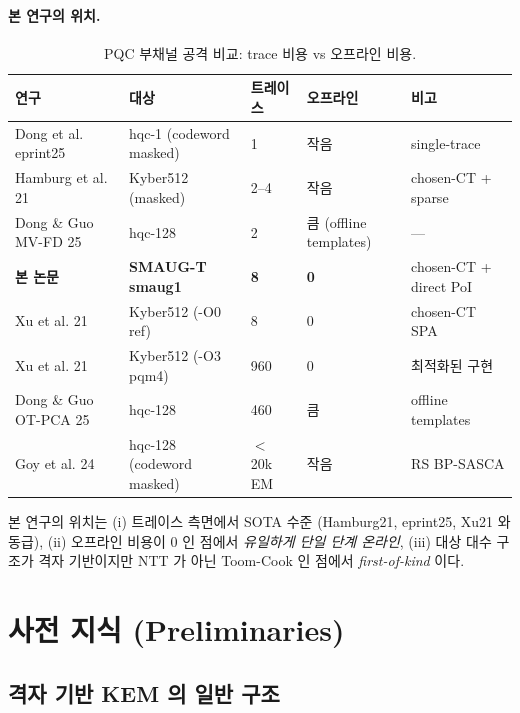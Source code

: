\documentclass[11pt]{article}
\theoremstyle{plain}
\theoremstyle{definition}
\theoremstyle{remark}
\begin{document}
\paragraph{본 연구의 위치.}

\begin{table}[h!]
\centering
\caption{PQC 부채널 공격 비교: trace 비용 vs 오프라인 비용.}
\label{tab:related}
\small
\begin{tabular}{lllll}
\toprule
연구 & 대상 & 트레이스 & 오프라인 & 비고 \\
\midrule
Dong et al. eprint25~\citep{donggu025singletrace} & hqc-1 (codeword masked) & 1 & 작음 & single-trace \\
Hamburg et al. 21~\citep{hamburg21} & Kyber512 (masked) & 2--4 & 작음 & chosen-CT + sparse \\
Dong \& Guo MV-FD 25~\citep{donggu025mvfd} & hqc-128 & 2 & 큼 (offline templates) & — \\
\textbf{본 논문} & \textbf{SMAUG-T smaug1} & \textbf{8} & \textbf{0} & chosen-CT + direct PoI \\
Xu et al. 21~\citep{xu21} & Kyber512 (-O0 ref) & 8 & 0 & chosen-CT SPA \\
Xu et al. 21~\citep{xu21} & Kyber512 (-O3 pqm4) & 960 & 0 & 최적화된 구현 \\
Dong \& Guo OT-PCA 25~\citep{donggu025otpca} & hqc-128 & 460 & 큼 & offline templates \\
Goy et al. 24~\citep{goy24} & hqc-128 (codeword masked) & $<$ 20k EM & 작음 & RS BP-SASCA \\
\bottomrule
\end{tabular}
\end{table}

본 연구의 위치는 (i) 트레이스 측면에서 SOTA 수준 (Hamburg21, eprint25, Xu21
와 동급), (ii) 오프라인 비용이 0 인 점에서 \emph{유일하게 단일 단계
온라인}, (iii) 대상 대수 구조가 격자 기반이지만 NTT 가 아닌 Toom-Cook 인
점에서 \emph{first-of-kind} 이다.

\section{사전 지식 (Preliminaries)}
\label{sec:prelim}

\subsection{격자 기반 KEM 의 일반 구조}
\end{document}
